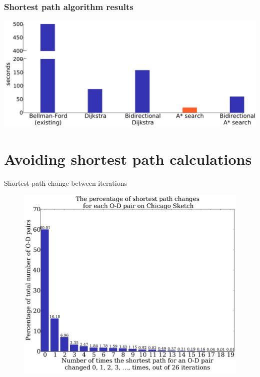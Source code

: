 \documentclass{beamer}
\begin{document}
\begin{frame}
    \frametitle{Shortest path algorithm results}
    \begin{center}
        \includegraphics[width=\textwidth, keepaspectratio]{img/runtime}
    \end{center}
\end{frame}

\section{Avoiding shortest path calculations}
\begin{frame}{Shortest path change between iterations}
    \begin{figure}
        \centering
        \includegraphics[width=.75\textwidth, keepaspectratio]{img/sp_change}
    \end{figure}
\end{frame}
\end{document}
